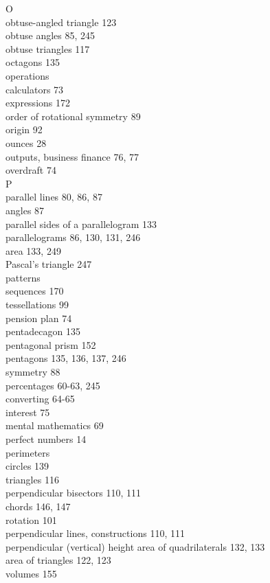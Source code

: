 \documentclass[10pt]{article}
\begin{document}
O\\
obtuse-angled triangle 123\\
obtuse angles 85, 245\\
obtuse triangles 117\\
octagons 135\\
operations\\
calculators 73\\
expressions 172\\
order of rotational symmetry 89\\
origin 92\\
ounces 28\\
outputs, business finance 76, 77\\
overdraft 74\\
P\\
parallel lines 80, 86, 87\\
angles 87\\
parallel sides of a parallelogram 133\\
parallelograms 86, 130, 131, 246\\
area 133, 249\\
Pascal's triangle 247\\
patterns\\
sequences 170\\
tessellations 99\\
pension plan 74\\
pentadecagon 135\\
pentagonal prism 152\\
pentagons 135, 136, 137, 246\\
symmetry 88\\
percentages 60-63, 245\\
converting 64-65\\
interest 75\\
mental mathematics 69\\
perfect numbers 14\\
perimeters\\
circles 139\\
triangles 116\\
perpendicular bisectors 110, 111\\
chords 146, 147\\
rotation 101\\
perpendicular lines, constructions 110, 111\\
perpendicular (vertical) height area of quadrilaterals 132, 133\\
area of triangles 122, 123\\
volumes 155\\
\end{document}
